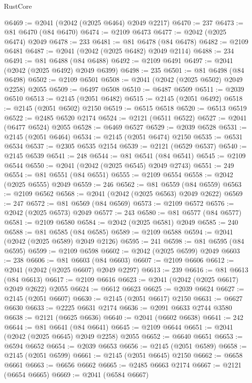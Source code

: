 \begin{lexlean}{RustCore}
\begin{coremodule}
@6469 := @2041 (@2042 (@2025 @6464) @2049 @2217)
@6470 := 237
@6473 := @81 @6470 (@84 @6470)
@6474 := @2109 @6473
@6477 := @2042 (@2025 @6474) @2049
@6478 := 233
@6481 := @81 @6478 (@84 @6478)
@6482 := @2109 @6481
@6487 := @2041 (@2042 (@2025 @6482) @2049 @2114)
@6488 := 234
@6491 := @81 @6488 (@84 @6488)
@6492 := @2109 @6491
@6497 := @2041 (@2042 (@2025 @6492) @2049 @6399)
@6498 := 235
@6501 := @81 @6498 (@84 @6498)
@6502 := @2109 @6501
@6508 := @2041 (@2042 (@2025 @6502) @2049 @2258) @2055
@6509 := @6497 @6508
@6510 := @6487 @6509
@6511 := @2039 @6510
@6513 := @2145 (@2051 @6482)
@6515 := @2145 (@2051 @6492)
@6518 := @2145 (@2051 @6502) @2150
@6519 := @6515 @6518
@6520 := @6513 @6519
@6522 := @2485 @6520 @2174
@6524 := @2121 (@6511 @6522)
@6527 := @2041 (@6477 @6524) @2055
@6528 := @6469 @6527
@6529 := @2039 @6528
@6531 := @2145 (@2051 @6464)
@6534 := @2145 (@2051 @6474) @2150
@6535 := @6531 @6534
@6537 := @2305 @6535 @2154
@6539 := @2121 (@6529 @6537)
@6540 := @2145 @6539
@6541 := 248
@6544 := @81 @6541 (@84 @6541)
@6545 := @2109 @6544
@6550 := @2041 (@2042 (@2025 @6545) @2049 @2743)
@6551 := 249
@6554 := @81 @6551 (@84 @6551)
@6555 := @2109 @6554
@6558 := @2042 (@2025 @6555) @2049
@6559 := 246
@6562 := @81 @6559 (@84 @6559)
@6563 := @2109 @6562
@6568 := @2041 (@2042 (@2025 @6563) @2049 @2622)
@6569 := 247
@6572 := @81 @6569 (@84 @6569)
@6573 := @2109 @6572
@6576 := @2042 (@2025 @6573) @2049
@6577 := 243
@6580 := @81 @6577 (@84 @6577)
@6581 := @2109 @6580
@6584 := @2042 (@2025 @6581) @2049
@6585 := 240
@6588 := @81 @6585 (@84 @6585)
@6589 := @2109 @6588
@6594 := @2041 (@2042 (@2025 @6589) @2049 @2126)
@6595 := 241
@6598 := @81 @6595 (@84 @6595)
@6599 := @2109 @6598
@6602 := @2042 (@2025 @6599) @2049
@6603 := 238
@6606 := @81 @6603 (@84 @6603)
@6607 := @2109 @6606
@6612 := @2041 (@2042 (@2025 @6607) @2049 @2297)
@6613 := 239
@6616 := @81 @6613 (@84 @6613)
@6617 := @2109 @6616
@6623 := @2041 (@2042 (@2025 @6617) @2049 @2622) @2055
@6624 := @6612 @6623
@6625 := @2039 @6624
@6627 := @2145 (@2051 @6607)
@6630 := @2145 (@2051 @6617) @2150
@6631 := @6627 @6630
@6633 := @2225 @6631 @2174
@6636 := @2091 @6633 @2744 @3580
@6638 := @2121 (@6625 @6636)
@6640 := @2041 (@6602 @6638)
@6641 := 242
@6644 := @81 @6641 (@84 @6641)
@6645 := @2109 @6644
@6651 := @2041 (@2042 (@2025 @6645) @2049 @2258) @2055
@6652 := @6640 @6651
@6653 := @6594 @6652
@6654 := @2039 @6653
@6656 := @2145 (@2051 @6589)
@6658 := @2145 (@2051 @6599)
@6661 := @2145 (@2051 @6645) @2150
@6662 := @6658 @6661
@6663 := @6656 @6662
@6665 := @2485 @6663 @2174
@6667 := @2121 (@6654 @6665)
@6669 := @2041 (@6584 @6667)

\end{coremodule}
\end{lexlean}

